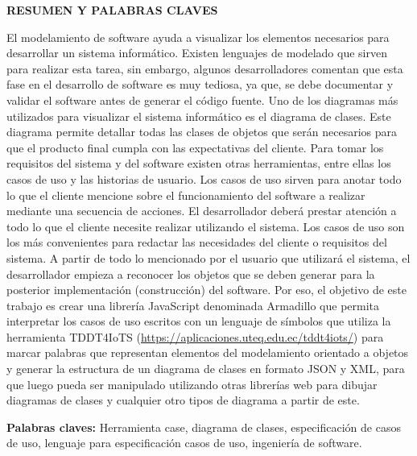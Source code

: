 \begin{center}
	{\titulodc \textbf{RESUMEN Y PALABRAS CLAVES}}
\end{center}

El modelamiento de software ayuda a visualizar los elementos necesarios para desarrollar un sistema informático. Existen lenguajes de modelado que sirven para realizar esta tarea, sin embargo, algunos desarrolladores comentan que esta fase en el desarrollo de software es muy tediosa, ya que, se debe documentar y validar el software antes de generar el código fuente. Uno de los diagramas más utilizados para visualizar el sistema informático es el diagrama de clases. Este diagrama permite detallar todas las clases de objetos que serán necesarios para que el producto final cumpla con las expectativas del cliente. Para tomar los requisitos del sistema y del software existen otras herramientas, entre ellas los casos de uso y las historias de usuario. Los casos de uso sirven para anotar todo lo que el cliente mencione sobre el funcionamiento del software a realizar mediante una secuencia de acciones. El desarrollador deberá prestar atención a todo lo que el cliente necesite realizar utilizando el sistema. Los casos de uso son los más convenientes para redactar las necesidades del cliente o requisitos del sistema. A partir de todo lo mencionado por el usuario que utilizará el sistema, el desarrollador empieza a reconocer los objetos que se deben generar para la posterior implementación (construcción) del software. Por eso, el objetivo de este trabajo es crear una librería JavaScript denominada Armadillo que permita interpretar  los casos de uso escritos con un lenguaje de símbolos que utiliza la herramienta TDDT4IoTS (\url{https://aplicaciones.uteq.edu.ec/tddt4iots/}) para marcar palabras que representan elementos del modelamiento orientado a objetos y generar la estructura de un diagrama de clases en formato JSON y XML, para que luego pueda ser manipulado utilizando otras librerías web para dibujar diagramas de clases y cualquier otro tipos de diagrama a partir de este.

\textbf{Palabras claves:} Herramienta case, diagrama de clases, especificación de casos de uso, lenguaje para especificación casos de uso, ingeniería de software.
